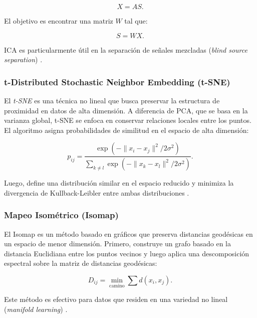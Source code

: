 \begin{itemize}
		\begin{equation}
			X = A S.
		\end{equation}
		
		El objetivo es encontrar una matriz \( W \) tal que:
		
		\begin{equation}
			S = W X.
		\end{equation}
		
		ICA es particularmente útil en la separación de señales mezcladas (\textit{blind source separation}) \cite{hyvarinen2000independent}.
		
		\subsubsection{t-Distributed Stochastic Neighbor Embedding (t-SNE)}
		
		El \textit{t-SNE} es una técnica no lineal que busca preservar la estructura de proximidad en datos de alta dimensión. A diferencia de PCA, que se basa en la varianza global, t-SNE se enfoca en conservar relaciones locales entre los puntos. El algoritmo asigna probabilidades de similitud en el espacio de alta dimensión:
		
		\begin{equation}
			p_{ij} = \frac{\exp(-\|x_i - x_j\|^2 / 2\sigma^2)}{\sum_{k \neq l} \exp(-\|x_k - x_l\|^2 / 2\sigma^2)}.
		\end{equation}
		
		Luego, define una distribución similar en el espacio reducido y minimiza la divergencia de Kullback-Leibler entre ambas distribuciones \cite{van2008visualizing}.
		
		\subsubsection{Mapeo Isométrico (Isomap)}
		
		El Isomap es un método basado en gráficos que preserva distancias geodésicas en un espacio de menor dimensión. Primero, construye un grafo basado en la distancia Euclidiana entre los puntos vecinos y luego aplica una descomposición espectral sobre la matriz de distancias geodésicas:
		
		\begin{equation}
			D_{ij} = \min_{\text{camino}} \sum d(x_i, x_j).
		\end{equation}
		
		Este método es efectivo para datos que residen en una variedad no lineal (\textit{manifold learning}) \cite{tenenbaum2000global}.
		

\end{itemize}
